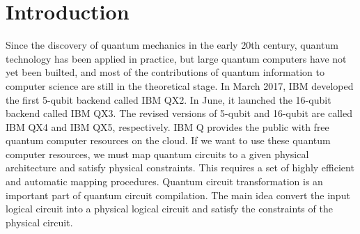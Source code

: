\documentclass[runningheads]{llncs}
\begin{document}
\section{Introduction}
\label{Introduction}
Since the discovery of quantum mechanics in the early 20th century,
quantum technology has been applied in practice, but large quantum computers
have not yet been builted, and most of the contributions of quantum 
information to computer science are still in the theoretical stage.
In March 2017, IBM developed the first 5-qubit backend called IBM QX2. 
In June, it launched the 16-qubit backend called IBM QX3. The revised versions of 5-qubit and 16-qubit 
are called IBM QX4 and IBM QX5, respectively.
IBM Q provides the public with free quantum computer resources on the cloud. 
If we want to use these quantum computer resources, 
we must map quantum circuits to a given physical architecture and 
satisfy physical constraints. This requires a set of highly efficient and 
automatic mapping procedures. Quantum circuit transformation is an important 
part of quantum circuit compilation. The main idea  convert the input
logical circuit into a physical logical circuit and satisfy the constraints of
the physical circuit.
\end{document}
